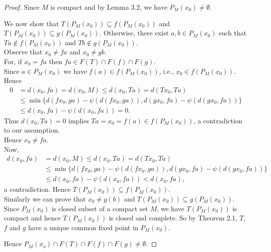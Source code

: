 \documentclass[11]{article}
\numberwithin{equation}{definition}
\begin{document}
\begin{proof}
Since $M$ is compact and by Lemma 3.2, we have $P_{M}(x_{0})\neq\emptyset$.

We now show that $T(P_{M}(x_{0}))\subseteq f(P_{M}(x_{0}))$ and $T(P_{M}(x_{0}))\subseteq g(P_{M}(x_{0}))$. Otherwise, there exist $a,b\in P_{M}(x_{0})$ such that $Ta\notin f(P_{M}(x_{0}))$ and $Tb\notin g(P_{M}(x_{0}))$.\\
Observe that $x_{0}\neq fa$ and $x_{0}\neq gb$.\\
For, if $x_{0}=fa$ then $fa\in F(T)\cap F(f)\cap F(g)$.\\
Since $a\in P_{M}(x_{0})$ we have $f(a)\in f(P_{M}(x_{0}))$, i.e., $x_{0}\in f(P_{M}(x_{0}))$.\\
Hence
\begin{align*}
0 &= d(x_{0},fa) = d(x_{0},M) \leq d(x_{0},Ta) = d(Tx_{0},Ta) \\
&\leq \min\{d(fx_{0},ga)-\psi(d(fx_{0},ga)),d(gx_{0},fa)-\psi(d(gx_{0},fa))\} \\
&\leq d(x_{0},fa)-\psi(d(x_{0},fa)) = 0.
\end{align*}
Thus $d(x_{0},Ta)=0$ implies $Ta=x_{0}=f(a)\in f(P_{M}(x_{0}))$, a contradiction to our assumption.\\
Hence $x_{0}\neq fa$.\\
Now,
\begin{align*}
d(x_{0},fa) &= d(x_{0},M) \leq d(x_{0},Ta) = d(Tx_{0},Ta) \\
&\leq \min\{d(fx_{0},ga)-\psi(d(fx_{0},ga)),d(gx_{0},fa)-\psi(d(gx_{0},fa))\} \\
&\leq d(x_{0},fa)-\psi(d(x_{0},fa)) < d(x_{0},fa),
\end{align*}
a contradiction. Hence $T(P_{M}(x_{0}))\subseteq f(P_{M}(x_{0}))$.\\
Similarly we can prove that $x_{0}\neq g(b)$ and $T(P_{M}(x_{0}))\subseteq g(P_{M}(x_{0}))$.\\
Since $P_{M}(x_{0})$ is closed subset of a compact set $M$, we have $T(P_{M}(x_{0}))$ is compact and hence $T(P_{M}(x_{0}))$ is closed and complete.
So by Theorem 2.1, $T$, $f$ and $g$ have a unique common fixed point in $P_{M}(x_{0})$.


Hence \(P_{M}(x_{o})\cap F(T)\cap F(f)\cap F(g)\neq\emptyset\).

\end{proof}
\end{document}
